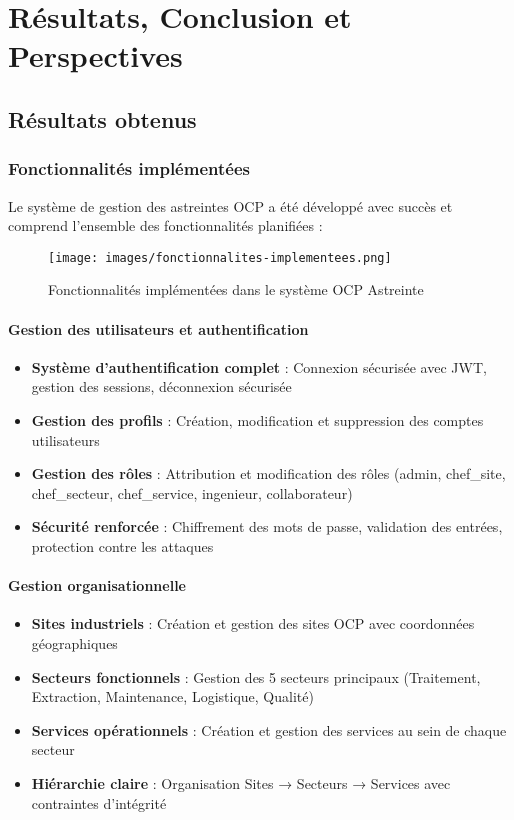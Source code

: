\chapter{Résultats, Conclusion et Perspectives}

\section{Résultats obtenus}
\subsection{Fonctionnalités implémentées}
Le système de gestion des astreintes OCP a été développé avec succès et comprend l'ensemble des fonctionnalités planifiées :

\begin{figure}[h]
\centering
\texttt{[image: images/fonctionnalites-implementees.png]}
\caption{Fonctionnalités implémentées dans le système OCP Astreinte}
\label{fig:fonctionnalites-implementees}
\end{figure}

\subsubsection{Gestion des utilisateurs et authentification}
\begin{itemize}
    \item \textbf{Système d'authentification complet} : Connexion sécurisée avec JWT, gestion des sessions, déconnexion sécurisée
    \item \textbf{Gestion des profils} : Création, modification et suppression des comptes utilisateurs
    \item \textbf{Gestion des rôles} : Attribution et modification des rôles (admin, chef\_site, chef\_secteur, chef\_service, ingenieur, collaborateur)
    \item \textbf{Sécurité renforcée} : Chiffrement des mots de passe, validation des entrées, protection contre les attaques
\end{itemize}

\subsubsection{Gestion organisationnelle}
\begin{itemize}
    \item \textbf{Sites industriels} : Création et gestion des sites OCP avec coordonnées géographiques
    \item \textbf{Secteurs fonctionnels} : Gestion des 5 secteurs principaux (Traitement, Extraction, Maintenance, Logistique, Qualité)
    \item \textbf{Services opérationnels} : Création et gestion des services au sein de chaque secteur
    \item \textbf{Hiérarchie claire} : Organisation Sites → Secteurs → Services avec contraintes d'intégrité
\end{itemize}

